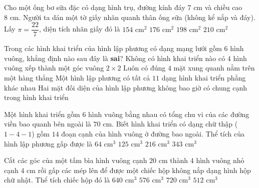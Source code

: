 \begin{ex} %
Cho một ống bơ sữa đặc có dạng hình trụ, đường kính đáy $7\text{ cm}$ và chiều cao $8\text{ cm}$. Người ta dán một tờ giấy nhãn quanh thân ống sữa (không kể nắp và đáy). Lấy $\pi = \dfrac{22}{7}$, diện tích nhãn giấy đó là
\choice
{$154\text{ cm}^2$}
{\True $176\text{ cm}^2$}
{$198\text{ cm}^2$}
{$210\text{ cm}^2$}
\end{ex}

\begin{ex} %
Trong các hình khai triển của hình lập phương có dạng mạng lưới gồm $6$ hình vuông, khẳng định nào sau đây là \textbf{sai}?
\choice
{Không có hình khai triển nào có $4$ hình vuông xếp thành một góc vuông $2 \times 2$}
{\True Luôn có đúng $4$ mặt xung quanh nằm trên một hàng thẳng}
{Một hình lập phương có tất cả $11$ dạng hình khai triển phẳng khác nhau}
{Hai mặt đối diện của hình lập phương không bao giờ có chung cạnh trong hình khai triển}
\end{ex}

\begin{ex} %
Một hình khai triển gồm $6$ hình vuông bằng nhau có tổng chu vi của các đường viền bao quanh bên ngoài là $70\text{ cm}$. Biết hình khai triển có dạng chữ thập ($1-4-1$) gồm $14$ đoạn cạnh của hình vuông ở đường bao ngoài. Thể tích của hình lập phương gấp được là
\choice
{$64\text{ cm}^3$}
{\True $125\text{ cm}^3$}
{$216\text{ cm}^3$}
{$343\text{ cm}^3$}
\end{ex}

\begin{ex} %
Cắt các góc của một tấm bìa hình vuông cạnh $20\text{ cm}$ thành $4$ hình vuông nhỏ cạnh $4\text{ cm}$ rồi gấp các mép lên để được một chiếc hộp không nắp dạng hình hộp chữ nhật. Thể tích chiếc hộp đó là
\choice
{$640\text{ cm}^3$}
{\True $576\text{ cm}^3$}
{$720\text{ cm}^3$}
{$512\text{ cm}^3$}
\end{ex}

